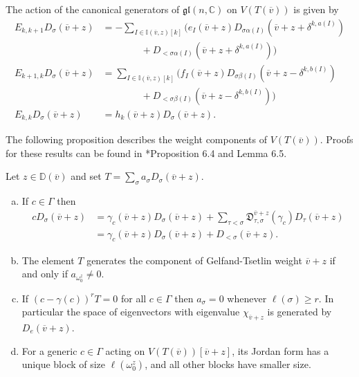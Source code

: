 \documentclass[11pt,fleqn]{amsart}
\newcommand\CC{\mathbb C}
\newcommand\gl{\mathfrak{gl}}
\newcommand\vv{\overline{v}}
\newcommand\II{\mathbb I}
\newcommand\DD{\mathbb D}
\newcommand\D{\mathfrak D}
\begin{document}
\begin{Theorem}
\label{T:gt-big-module}
The action of the canonical generators of $\gl(n,\CC)$ on $V(T(\vv))$ is given 
by
\begin{align*}
E_{k,k+1} D_\sigma(\vv + z) &= 
	 - \sum_{I \in \II(\vv,z)[k]} \bigg(
		e_I(\vv + z) D_{\sigma\alpha(I)}(\vv+z + \delta^{k,a(I)})\\
			&\qquad\qquad + D_{<\sigma\alpha(I)}(\vv+z + \delta^{k,a(I)})
			\bigg) \\
E_{k+1,k} D_\sigma(\vv + z) &=
	\sum_{I \in \II(\vv,z)[k]} \bigg(
		f_I(\vv + z) D_{\sigma\beta(I)}(\vv + z - \delta^{k,b(I)}) \\
			&\qquad\qquad
			+  D_{<\sigma\beta(I)}(\vv + z - \delta^{k,b(I)})
			\bigg)\\
E_{k,k} D_{\sigma}(\vv + z) 
	&= h_k(\vv + z) D_{\sigma}(\vv+z). 
\end{align*}
\end{Theorem}
The following proposition describes the weight components of $V(T(\vv))$. 
Proofs for these results can be found in \cite{FGRZ18}*{Proposition 6.4 and
Lemma 6.5}.
\begin{Proposition}
\label{P:gt-weight-spaces}
Let $z \in \DD(\vv)$ and set $T = \sum_\sigma a_\sigma D_\sigma(\vv + z)$.
\begin{enumerate}[(a)]
\item 
\label{i:action}
If $c \in \Gamma$ then
\begin{align*}
c D_\sigma(\vv + z)
	&= \gamma_c(\vv+z)D_\sigma(\vv+z) +
		\sum_{\tau < \sigma} \D_{\tau,\sigma}^{\vv + z}(\gamma_c) 
			D_\tau(\vv+z)\\
	&= \gamma_c(\vv+z)D_\sigma(\vv+z) + D_{<\sigma}(\vv+z).
\end{align*}

\item 
\label{i:generator}
The element $T$ generates the component of Gelfand-Tsetlin weight $\vv+z$
if and only if $a_{\omega_0^z} \neq 0$.

\item 
\label{i:eigenvalue}
If $(c - \gamma(c))^r T = 0$ for all $c \in \Gamma$ then $a_\sigma = 0$
whenever $\ell(\sigma) \geq r$. In particular the space of eigenvectors with
eigenvalue $\chi_{\vv + z}$ is generated by $D_e(\vv + z)$.

\item
\label{i:jordan} 
For a generic $c \in \Gamma$ acting on $V(T(\vv))[\vv + z]$, its Jordan form
has a unique block of size $\ell(\omega_0^z)$, and all other blocks have 
smaller size.
\end{enumerate}
\end{Proposition}
\end{document}
